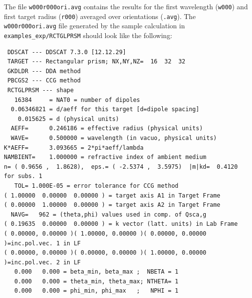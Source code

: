 \begin{appendix}
The file {\tt w000r000ori.avg} contains the results for the first wavelength
({\tt w000}) and first target radius ({\tt r000})
averaged over orientations ({\tt .avg}).
The {\tt w000r000ori.avg} file generated by the sample calculation 
in {\tt examples\_exp/RCTGLPRSM}
should look like the following:
\vspace*{-0.4em}
{\scriptsize
\begin{verbatim}
 DDSCAT --- DDSCAT 7.3.0 [12.12.29]   
 TARGET --- Rectangular prism; NX,NY,NZ=  16  32  32                          
 GKDLDR --- DDA method
 PBCGS2 --- CCG method
 RCTGLPRSM --- shape 
   16384     = NAT0 = number of dipoles
  0.06346821 = d/aeff for this target [d=dipole spacing]
    0.015625 = d (physical units)
  AEFF=      0.246186 = effective radius (physical units)
  WAVE=      0.500000 = wavelength (in vacuo, physical units)
K*AEFF=      3.093665 = 2*pi*aeff/lambda
NAMBIENT=    1.000000 = refractive index of ambient medium
n= ( 0.9656 ,  1.8628),  eps.= ( -2.5374 ,  3.5975)  |m|kd=  0.4120 for subs. 1
   TOL= 1.000E-05 = error tolerance for CCG method
( 1.00000  0.00000  0.00000 ) = target axis A1 in Target Frame
( 0.00000  1.00000  0.00000 ) = target axis A2 in Target Frame
  NAVG=   962 = (theta,phi) values used in comp. of Qsca,g
( 0.19635  0.00000  0.00000 ) = k vector (latt. units) in Lab Frame
( 0.00000, 0.00000 )( 1.00000, 0.00000 )( 0.00000, 0.00000 )=inc.pol.vec. 1 in LF
( 0.00000, 0.00000 )( 0.00000, 0.00000 )( 1.00000, 0.00000 )=inc.pol.vec. 2 in LF
   0.000   0.000 = beta_min, beta_max ;  NBETA = 1
   0.000   0.000 = theta_min, theta_max; NTHETA= 1
   0.000   0.000 = phi_min, phi_max   ;   NPHI = 1


\end{verbatim}}
\end{appendix}
